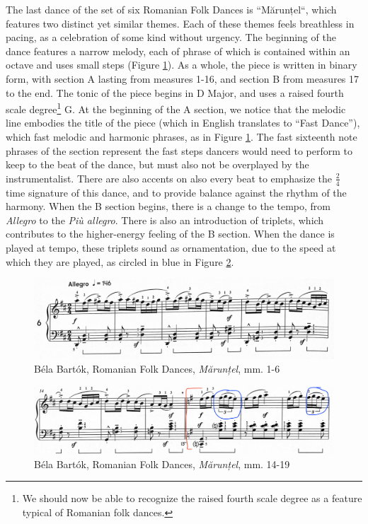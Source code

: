 The last dance of the set of six Romanian Folk Dances is ``Mărunțel``, which features two distinct yet similar themes. Each of these themes feels breathless in pacing, as a celebration of some kind without urgency. The beginning of the dance features a narrow melody, each of phrase of which is contained within an octave and uses small steps (Figure \ref{fig:bartok-dance-six-first-line}\autocite{Lung_2016}). As a whole, the piece is written in binary form, with section A lasting from measures 1-16, and section B from measures 17 to the end. The tonic of the piece begins in D Major, and uses a raised fourth scale degree\footnote{We should now be able to recognize the raised fourth scale degree as a feature typical of Romanian folk dances.} G\musSharp{}. At the beginning of the A section, we notice that the melodic line embodies the title of the piece (which in English translates to ``Fast Dance''), which fast melodic and harmonic phrases, as in Figure \ref{fig:bartok-dance-six-first-line}\autocite{Lung_2016}. The fast sixteenth note phrases of the section represent the fast steps dancers would need to perform to keep to the beat of the dance, but must also not be overplayed by the instrumentalist. There are also accents on also every beat to emphasize the $\frac{2}{4}$ time signature of this dance, and to provide balance against the rhythm of the harmony. When the B section begins, there is a change to the tempo, from \textit{Allegro} to the \textit{Più allegro}. There is also an introduction of triplets, which contributes to the higher-energy feeling of the B section. When the dance is played at tempo, these triplets sound as ornamentation, due to the speed at which they are played, as circled in blue in Figure \ref{fig:bartok-dance-six-b-section}\autocite{Lung_2016}. 

\begin{figure}
  \centering
  \includegraphics[width=\textwidth]{figures/bartok-dance-six-first-line.jpg}
  \caption{Béla Bartók, Romanian Folk Dances, \textit{Mărunțel}, mm. 1-6}
  \label{fig:bartok-dance-six-first-line}
\end{figure}

\begin{figure}
  \centering
  \includegraphics[width=\textwidth]{figures/bartok-dance-six-b-section.jpg}
  \caption{Béla Bartók, Romanian Folk Dances, \textit{Mărunțel}, mm. 14-19}
  \label{fig:bartok-dance-six-b-section}
\end{figure}

